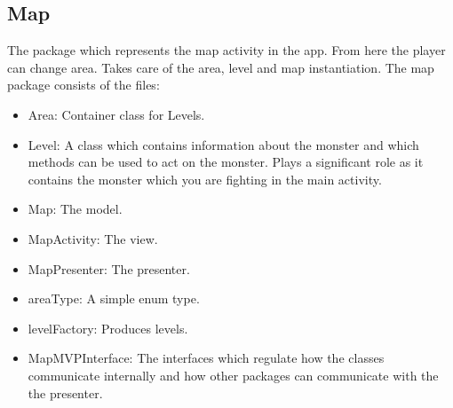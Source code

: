 \documentclass{article}
\begin{document}
\subsection{Map}
The package which represents the map activity in the app. From here the player can change area. Takes care of the area, level and map instantiation.
The map package consists of the files:
\begin{itemize}
    \item Area: Container class for Levels.
    \item Level: A class which contains information about the monster and which methods can be used to act on the monster. Plays a significant role as it contains the monster which you are fighting in the main activity.
    \item Map: The model.
    \item MapActivity: The view.
    \item MapPresenter: The presenter.
    \item areaType: A simple enum type.
    \item levelFactory: Produces levels.
    \item MapMVPInterface: The interfaces which regulate how the classes communicate internally and how other packages can communicate with the the presenter.
\end{itemize}
\end{document}
